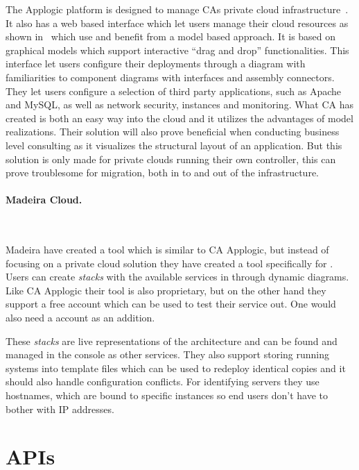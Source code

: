 The Applogic platform is designed to manage CAs private cloud 
infrastructure~\cite{introducing-cloud-services}.
It also has a web based interface which let users manage their cloud resources 
as shown in~ which use and benefit from a model based approach.
It is based on graphical models which support interactive ``drag and drop'' functionalities.
This interface let users configure their deployments through a diagram with familiarities to 
 component diagrams with interfaces and assembly connectors. 
They let users configure a selection of third party applications, 
such as Apache and MySQL, as well as network security, instances and monitoring. 
What CA has created is both an easy way into the cloud and it utilizes 
the advantages of model realizations. 
Their solution will also prove beneficial when conducting business level consulting
as it visualizes the structural layout of an application.
But this solution is only made for private clouds running their own controller, 
this can prove troublesome for migration, both in to and out of the infrastructure.

\paragraph{Madeira Cloud.}~\cite{madeiracloud}



Madeira have created a tool which is similar to CA Applogic, but instead of focusing
on a private cloud solution they have created a tool specifically for  .
Users can create \emph{stacks} with the available services in  through 
dynamic diagrams.
Like CA Applogic their tool is also proprietary, but on the other hand they support
a free account which can be used to test their service out.
One would also need a  account as an addition.

These \emph{stacks} are live representations of the architecture and can be found 
and managed in the  console as other  services.
They also support storing running systems into template files which can be used
to redeploy identical copies and it should also handle configuration conflicts.
For identifying servers they use hostnames, which are bound to specific instances 
so end users don't have to bother with IP addresses.

\section{APIs}

